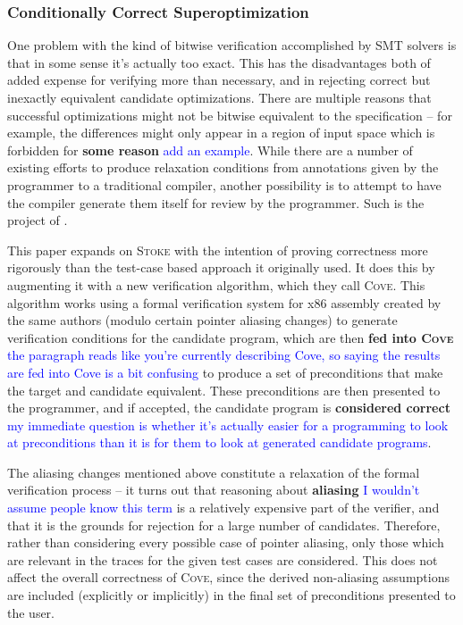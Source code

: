 \documentclass[12pt,twoside]{reedthesis}
\newcommand{\comment}[2]{\textbf{#1} \textcolor{blue}{#2}}
\begin{document}
\subsubsection{Conditionally Correct Superoptimization}
One problem with the kind of bitwise verification accomplished by SMT solvers is that in some sense it's actually too exact.
This has the disadvantages both of added expense for verifying more than necessary, and in rejecting correct but inexactly equivalent candidate optimizations.
There are multiple reasons that successful optimizations might not be bitwise equivalent to the specification
    -- for example, the differences might only appear in a region of input space which is forbidden for \comment{some reason}{add an example}.
While there are a number of existing efforts to produce relaxation conditions from annotations given by the programmer to a traditional compiler, another possibility is to attempt to have the compiler generate them itself for review by the programmer.
Such is the project of \cite{sharma2015conditionally}.
    
This paper expands on \textsc{Stoke} with the intention of proving correctness more rigorously than the test-case based approach it originally used.
It does this by augmenting it with a new verification algorithm, which they call \textsc{Cove}.
This algorithm works using a formal verification system for x86 assembly created by the same authors \cite{sharma2013ddec} (modulo certain pointer aliasing changes) to generate verification conditions for the candidate program, which are then
    \comment{fed into \textsc{Cove}}{the paragraph reads like you're currently describing Cove, so saying the results are fed into Cove is a bit confusing}
    to produce a set of preconditions that make the target and candidate equivalent.
These preconditions are then presented to the programmer, and if accepted, the candidate program is
    \comment{considered correct}{my immediate question is whether it's actually easier for a programming to look at preconditions than it is for them to look at generated candidate programs}.
    
The aliasing changes mentioned above constitute a relaxation of the formal verification process -- it turns out that reasoning about
    \comment{aliasing}{I wouldn't assume people know this term}
    is a relatively expensive part of the verifier, and that it is the grounds for rejection for a large number of candidates.
Therefore, rather than considering every possible case of pointer aliasing, only those which are relevant in the traces for the given test cases are considered.
This does not affect the overall correctness of \textsc{Cove}, since the derived non-aliasing assumptions are included (explicitly or implicitly) in the final set of preconditions presented to the user.
    
\end{document}
